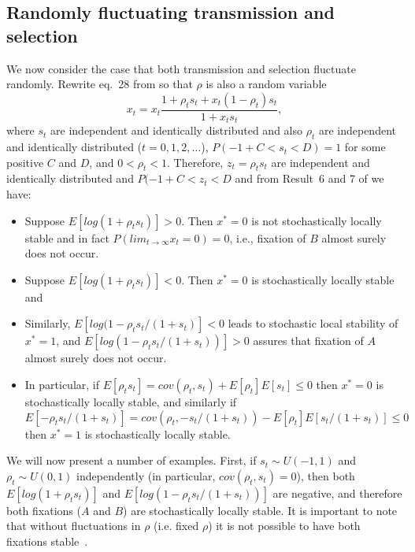 \documentclass[12pt]{extarticle} %
\begin{document}
\subsection*{Randomly fluctuating transmission and selection}

We now consider the case that both transmission and selection fluctuate randomly.
Rewrite eq.~28 from \citet{Ram2018} so that $\rho$ is also a random variable
\begin{equation}
x_t = x_t \frac{1 + \rho_t s_t + x_t (1 - \rho_t) s_t}{1 + x_t s_t},
\end{equation}
where $s_t$ are independent and identically distributed and also $\rho_t$ are independent and identically distributed ($t=0,1,2,\ldots$), $P(-1+C<s_t<D)=1$ for some positive $C$ and $D$, and $0<\rho_t<1$.
Therefore, $z_t = \rho_t s_t$  are independent and identically distributed and $P(-1+C < z_t < D$ and from Result~6 and 7 of \citet{Ram2018} we have:
\begin{itemize}
\item Suppose $E[log(1+\rho_t s_t)]>0$. Then $x^*=0$ is not stochastically locally stable and in fact $P(lim_{t \to \infty} x_t=0) = 0$, i.e., fixation of $B$ almost surely does not occur.
\item Suppose $E[log(1+\rho_t s_t)]<0$. Then $x^*=0$ is stochastically locally stable and 
\item Similarly, $E[log(1-\rho_t s_t/(1+s_t)]<0$ leads to stochastic local stability of $x^*=1$, and $E[log(1-\rho_t s_t/(1+s_t))]>0$ assures that fixation of $A$ almost surely does not occur.
\item In particular, if $E[\rho_t s_t] = cov(\rho_t, s_t) + E[\rho_t] E[s_t] \le 0$ then $x^*=0$ is stochastically locally stable, and similarly if $E[-\rho_t s_t/(1+s_t)] = cov(\rho_t, -s_t/(1+s_t)) - E[\rho_t] E[s_t/(1+s_t)] \le 0$ then $x^*=1$ is stochastically locally stable.
\end{itemize}

We will now present a number of examples.
First, if $s_t \sim U(-1, 1)$ and $\rho_t \sim U(0,1)$ independently (in particular, $cov(\rho_t, s_t)=0$), then both $E[log(1+\rho_t s_t)]$ and $E[log(1-\rho_t s_t/(1+s_t))]$ are negative, and therefore both fixations ($A$ and $B$) are stochastically locally stable. 
It is important to note that without fluctuations in $\rho$ (i.e. fixed $\rho$) it is not possible to have both fixations stable~\citep{Ram2018}.
\end{document}
